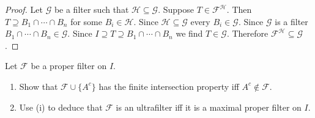 \begin{proof}
    Let $\mathcal G$ be a filter such that $\mathcal H \subseteq \mathcal G$.
    Suppose $T \in \mathcal F^{\mathcal H}$.
    Then $T \supseteq B_1 \cap \cdots \cap B_n$ for some $B_i \in \mathcal H$.
    Since $\mathcal H \subseteq \mathcal G$ every $B_i \in \mathcal G$.
    Since $\mathcal G$ is a filter $B_1 \cap \cdots \cap B_n \in \mathcal G$.
    Since $I \supseteq T \supseteq B_1 \cap \cdots \cap B_n$ we find $T \in \mathcal G$.
    Therefore $\mathcal F^{\mathcal H} \subseteq \mathcal G$.
\end{proof}

\begin{tcolorbox}[title=Problem 5, breakable]
    Let $\mathcal{F}$ be a proper filter on $I$.
    \begin{enumerate}
        \item Show that $\mathcal{F} \cup \{A^c\}$ has the finite intersection property iff $A^c \not \in \mathcal{F}$.
        \item Use (i) to deduce that $\mathcal{F}$ is an ultrafilter iff it is a maximal proper filter on $I$.
    \end{enumerate}
\end{tcolorbox}